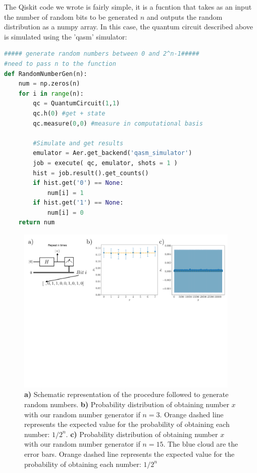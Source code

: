 \documentclass[12pt]{article}
\begin{document}
\begin{appendices}
The Qiskit code we wrote is fairly simple, it is a fucntion that takes as an input the number of random bits to be generated $n$ and outputs the random distribution as a numpy array. In this case, the quantum circuit described above is simulated using the 'qasm' simulator:

\begin{lstlisting}[language=Python]
##### generate random numbers between 0 and 2^n-1#####
#need to pass n to the function
def RandomNumberGen(n):
    num = np.zeros(n)
    for i in range(n):
        qc = QuantumCircuit(1,1)
        qc.h(0) #get + state
        qc.measure(0,0) #measure in computational basis
        
        #Simulate and get results
        emulator = Aer.get_backend('qasm_simulator')
        job = execute( qc, emulator, shots = 1 )
        hist = job.result().get_counts()
        if hist.get('0') == None:
            num[i] = 1
        if hist.get('1') == None:
            num[i] = 0
    return num
    \end{lstlisting}
    
\begin{figure}[htpb]
        \includegraphics[width=0.95\textwidth]{plot1.pdf}
       \caption{\label{FIG_01: Plot1} \textbf{a)} Schematic representation of the procedure followed to generate random numbers. \textbf{b)} Probability distribution of obtaining number $x$ with our random number generator if $n = 3$. Orange dashed line represents the expected value for the probability of obtaining each number: $1/2^n$. \textbf{c)} Probability distribution of obtaining number $x$ with our random number generator if $n = 15$. The blue cloud are the error bars. Orange dashed line represents the expected value for the probability of obtaining each number: $1/2^n$} 
    \end{figure} 
    

\end{appendices}
\end{document}
